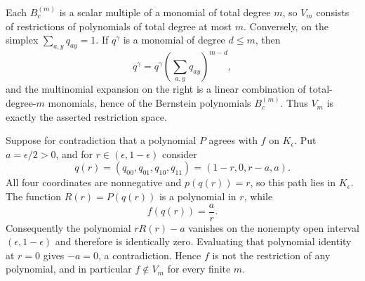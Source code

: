 Each \(B_c^{(m)}\) is a scalar multiple of a monomial of total degree \(m\), so \(V_m\) consists of restrictions of polynomials of total degree at most \(m\).  Conversely, on the simplex \(\sum_{a,y}q_{ay}=1\).  If \(q^{\gamma}\) is a monomial of degree \(d\leq m\), then
\[
 q^{\gamma}=q^{\gamma}\left(\sum_{a,y}q_{ay}\right)^{m-d},
\]
and the multinomial expansion on the right is a linear combination of total-degree-\(m\) monomials, hence of the Bernstein polynomials \(B_c^{(m)}\).  Thus \(V_m\) is exactly the asserted restriction space.

Suppose for contradiction that a polynomial \(P\) agrees with \(f\) on \(K_{\epsilon}\).  Put \(a=\epsilon/2>0\), and for \(r\in(\epsilon,1-\epsilon)\) consider
\[
 q(r)=(q_{00},q_{01},q_{10},q_{11})=(1-r,0,r-a,a).
\]
All four coordinates are nonnegative and \(p(q(r))=r\), so this path lies in \(K_{\epsilon}\).  The function \(R(r)=P(q(r))\) is a polynomial in \(r\), while
\[
 f(q(r))=\frac{a}{r}.
\]
Consequently the polynomial \(rR(r)-a\) vanishes on the nonempty open interval \((\epsilon,1-\epsilon)\) and therefore is identically zero.  Evaluating that polynomial identity at \(r=0\) gives \(-a=0\), a contradiction.  Hence \(f\) is not the restriction of any polynomial, and in particular \(f\notin V_m\) for every finite \(m\).